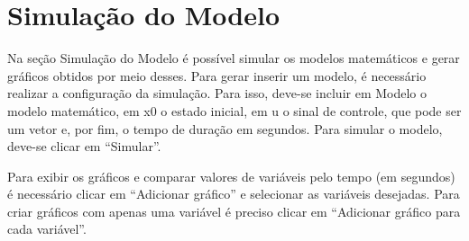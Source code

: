
\chapter{Simulação do Modelo}%
\label{chapter:simulacao-do-modelo}

Na seção Simulação do Modelo é possível simular os modelos matemáticos e gerar gráficos obtidos por meio desses. Para gerar inserir um modelo, é necessário realizar a configuração da simulação. Para isso, deve-se incluir em Modelo o modelo matemático, em x0 o estado inicial, em u o sinal de controle, que pode ser um vetor e, por fim, o tempo de duração em segundos. Para simular o modelo, deve-se clicar em “Simular”.

Para exibir os gráficos e comparar valores de variáveis pelo tempo (em segundos) é necessário clicar em “Adicionar gráfico” e selecionar as variáveis desejadas. Para criar gráficos com apenas uma variável é preciso clicar em “Adicionar gráfico para cada variável”.

